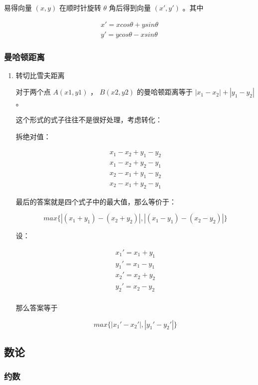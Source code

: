 \documentclass[11pt]{article}
\begin{document}
易得向量 $(x,y)$ 在顺时针旋转 $\theta$ 角后得到向量 $(x',y')$ 。其中

$$\begin{aligned}
x'=xcos \theta+ysin\theta \\
y'=ycos \theta-xsin\theta
\end{aligned}$$

\subsubsection{曼哈顿距离}
\label{sec-3-2-2}
\begin{enumerate}
\item 转切比雪夫距离
\label{sec-3-2-2-1}

对于两个点 $A(x1,y1)$ ， $B(x2,y2)$ 的曼哈顿距离等于 $|x_1-x_2|+|y_1-y_2|$ 。  

这个形式的式子往往不是很好处理，考虑转化：

拆绝对值：

$$\begin{aligned}
x_1-x_2+y_1-y_2 \\
x_1-x_2+y_2-y_1 \\
x_2-x_1+y_1-y_2 \\
x_2-x_1+y_2-y_1
\end{aligned}$$

最后的答案就是四个式子中的最大值，那么等价于：

$$
max\{|(x_1+y_1)-(x_2+y_2)|,|(x_1-y_1)-(x_2-y_2)|\}
$$

设：

$$\begin{aligned}
x_1'=x_1+y_1 \\
y_1'=x_1-y_1 \\
x_2'=x_2+y_2 \\
y_2'=x_2-y_2 \\
\end{aligned}$$


那么答案等于

$$
max\{|x_1'-x_2'|,|y_1'-y_2'|\}
$$
\end{enumerate}

\subsection{数论}
\label{sec-3-3}
\subsubsection{约数}
\label{sec-3-3-1}
\end{document}
